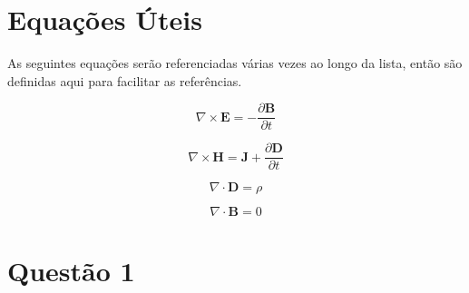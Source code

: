 \chapter*{Equações Úteis}

As seguintes equações serão referenciadas várias vezes ao longo da lista, 
então são definidas aqui para facilitar as referências.

\begin{equation}
\nabla \times \mathbf{E} = -\frac{\partial \mathbf{B}}{\partial t}
\label{eq:faraday_EB}
\end{equation}

\begin{equation}
\nabla \times \mathbf{H} = \mathbf{J} + \frac{\partial \mathbf{D}}{\partial t}
\label{eq:ampere_HD}
\end{equation}

\begin{equation}
\nabla \cdot \mathbf{D} = \rho
\label{eq:gauss_D}
\end{equation}

\begin{equation}
\nabla \cdot \mathbf{B} = 0
\label{eq:gauss_B}
\end{equation}





\chapter{Questão 1}\label{cap:q1}

